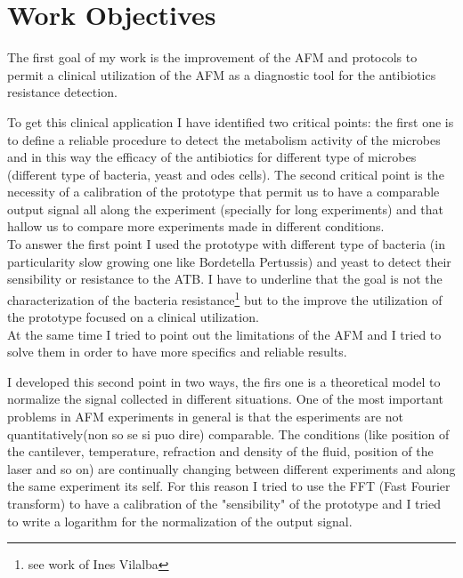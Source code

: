 \documentclass[11pt, a4paper]{article}
\begin{document}
\section{Work Objectives}

The first goal of my work is the improvement of the AFM and protocols to permit a clinical utilization of the AFM as a diagnostic tool for the antibiotics resistance detection. 

To get this clinical application I have identified two critical points: the first one is to define a reliable procedure to detect the metabolism activity of the microbes and in this way the efficacy of the antibiotics for different type of microbes (different type of bacteria, yeast and odes cells). The second critical point is the necessity of a calibration of the prototype that permit us to have a comparable output signal all along the experiment (specially for long experiments) and that hallow us to compare more experiments made in different conditions. 
\\
To answer the first point I used the prototype with different type of bacteria (in particularity slow growing one like Bordetella Pertussis) and yeast to detect their sensibility or resistance to the ATB.
I have to underline that the goal is not the characterization of the bacteria resistance\footnote{see work of Ines Vilalba} but to the improve the utilization of the prototype focused on a clinical utilization. 
\\
At the same time I tried to point out the limitations of the AFM and I tried to solve them in order to have more specifics and reliable results.

I developed this second point in two ways, the firs one is a theoretical model to normalize the signal collected in different situations. 
One of the most important problems in AFM experiments in general is that the esperiments are not quantitatively(non so se si puo dire) comparable. The conditions (like position of the cantilever, temperature, refraction and density of the fluid, position of the laser and so on) are continually changing between different experiments and along the same experiment its self. For this reason I tried to use the FFT (Fast Fourier transform) to have a calibration of the "sensibility" of the prototype and I tried to write a logarithm for the normalization of the output signal.
\end{document}

